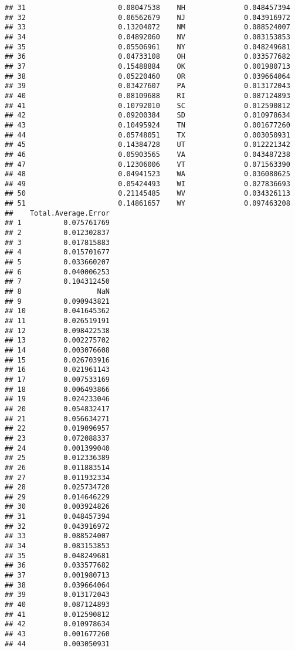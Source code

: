 \documentclass{article}\usepackage[]{graphicx}\usepackage[]{color}
\makeatletter
\newenvironment{kframe}{%
 \def\at@end@of@kframe{}%
 \ifinner\ifhmode%
  \def\at@end@of@kframe{\end{minipage}}%
  \begin{minipage}{\columnwidth}%
 \fi\fi%
 \def\FrameCommand##1{\hskip\@totalleftmargin \hskip-\fboxsep
 \colorbox{shadecolor}{##1}\hskip-\fboxsep
     \hskip-\linewidth \hskip-\@totalleftmargin \hskip\columnwidth}%
 \MakeFramed {\advance\hsize-\width
   \@totalleftmargin\z@ \linewidth\hsize
   \@setminipage}}%
 {\par\unskip\endMakeFramed%
 \at@end@of@kframe}
\newenvironment{knitrout}{}{} %
\makeatother
\begin{document}
\begin{knitrout}
\begin{kframe}
\begin{verbatim}
## 31                      0.08047538    NH              0.048457394
## 32                      0.06562679    NJ              0.043916972
## 33                      0.13204072    NM              0.088524007
## 34                      0.04892060    NV              0.083153853
## 35                      0.05506961    NY              0.048249681
## 36                      0.04733108    OH              0.033577682
## 37                      0.15488884    OK              0.001980713
## 38                      0.05220460    OR              0.039664064
## 39                      0.03427607    PA              0.013172043
## 40                      0.08109688    RI              0.087124893
## 41                      0.10792010    SC              0.012590812
## 42                      0.09200384    SD              0.010978634
## 43                      0.10495924    TN              0.001677260
## 44                      0.05748051    TX              0.003050931
## 45                      0.14384728    UT              0.012221342
## 46                      0.05903565    VA              0.043487238
## 47                      0.12306006    VT              0.071563390
## 48                      0.04941523    WA              0.036080625
## 49                      0.05424493    WI              0.027836693
## 50                      0.21145485    WV              0.034326113
## 51                      0.14861657    WY              0.097463208
##    Total.Average.Error
## 1          0.075761769
## 2          0.012302837
## 3          0.017815883
## 4          0.015701677
## 5          0.033660207
## 6          0.040006253
## 7          0.104312450
## 8                  NaN
## 9          0.090943821
## 10         0.041645362
## 11         0.026519191
## 12         0.098422538
## 13         0.002275702
## 14         0.003076608
## 15         0.026703916
## 16         0.021961143
## 17         0.007533169
## 18         0.006493866
## 19         0.024233046
## 20         0.054832417
## 21         0.056634271
## 22         0.019096957
## 23         0.072088337
## 24         0.001399040
## 25         0.012336389
## 26         0.011883514
## 27         0.011932334
## 28         0.025734720
## 29         0.014646229
## 30         0.003924826
## 31         0.048457394
## 32         0.043916972
## 33         0.088524007
## 34         0.083153853
## 35         0.048249681
## 36         0.033577682
## 37         0.001980713
## 38         0.039664064
## 39         0.013172043
## 40         0.087124893
## 41         0.012590812
## 42         0.010978634
## 43         0.001677260
## 44         0.003050931

\end{verbatim}
\end{kframe}
\end{knitrout}
\end{document}

